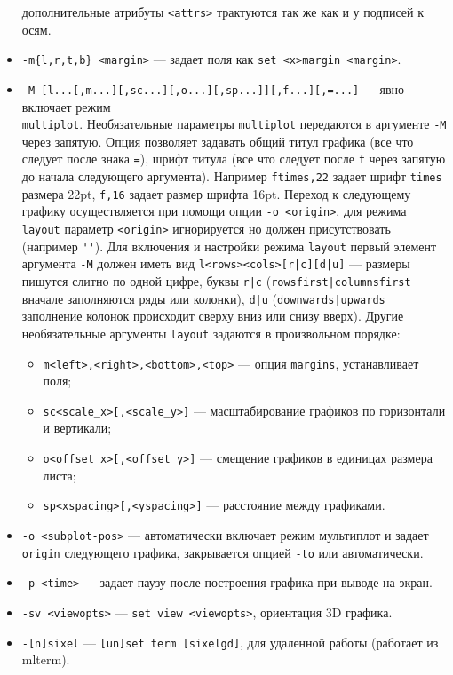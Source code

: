\documentclass[12pt]{article}
\begin{document}
\begin{itemize}
   дополнительные атрибуты \verb'<attrs>' трактуются так же как и у подписей к осям.
\item \verb'-m{l,r,t,b} <margin>' ---  задает поля как \verb'set <x>margin <margin>'.
\item \verb'-M [l...[,m...][,sc...][,o...][,sp...]][,f...][,=...]' --- явно включает режим\\ \verb'multiplot'.
Необязательные параметры \verb'multiplot' передаются в аргументе \verb'-M'  через запятую.
Опция позволяет задавать общий титул графика (все что следует после знака \verb'='),
шрифт титула (все что следует после \verb'f' через запятую до начала следующего аргумента).
Например \verb'ftimes,22' задает шрифт \verb'times' размера 22pt,  \verb'f,16' задает размер шрифта 16pt.
Переход к следующему графику осуществляется при помощи опции \verb'-o <origin>', для 
режима \verb'layout' параметр  \verb'<origin>' игнорируется но должен присутствовать (например \verb|''|). 
Для включения и настройки режима \verb'layout' первый элемент аргумента \verb'-M' должен иметь вид
\verb'l<rows><cols>[r|с][d|u]' ---  размеры пишутся слитно по одной 
цифре, буквы \verb'r|с' (\verb'rowsfirst|columnsfirst' вначале заполняются ряды или колонки),
\verb'd|u' (\verb'downwards|upwards' заполнение колонок происходит сверху вниз или снизу вверх).
Другие необязательные аргументы \verb'layout' задаются в произвольном порядке:
\begin{itemize}
\item  \verb'm<left>,<right>,<bottom>,<top>' --- опция \verb'margins', устанавливает поля;
\item  \verb'sс<scale_x>[,<scale_y>]' --- масштабирование графиков по горизонтали и вертикали;
\item  \verb'o<offset_x>[,<offset_y>]' --- смещение графиков в единицах размера листа;
\item  \verb'sp<xspacing>[,<yspacing>]' --- расстояние между графиками.
\end{itemize}
\item \verb'-o <subplot-pos>' --- автоматически включает режим мультиплот и задает \verb'origin'
   следующего графика, закрывается опцией \verb'-to' или автоматически.
\item \verb'-p <time>' --- задает паузу после построения графика при выводе на экран.
\item \verb'-sv <viewopts>' --- \verb'set view <viewopts>', ориентация 3D графика.
\item \verb'-[n]sixel' --- \verb'[un]set term [sixelgd]', для удаленной работы (работает из mlterm).

\end{itemize}
\end{document}
